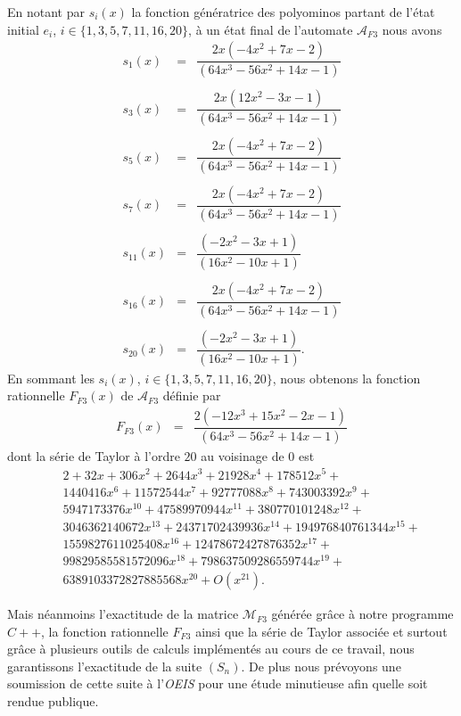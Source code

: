 En notant par $s_{i}(x)$ la fonction génératrice des polyominos partant de l'état initial $e_{i}$, $i\in \{1, 3, 5, 7, 11, 16, 20\}$, à un état final de l'automate $\mathcal{A}_{F3}$ nous avons
\begin{eqnarray*}
s_1(x)& = & \dfrac{2x(-4x^{2} + 7x - 2)}{(64x^{3} - 56x^{2} + 14x - 1)}\\
& &\\
s_3(x)& = & \dfrac{2x(12x^{2} - 3x - 1)}{(64x^{3} - 56x^{2} + 14x - 1)}\\
& &\\
s_5(x)& = & \dfrac{2x(-4x^{2} + 7x - 2)}{(64x^{3} - 56x^{2} + 14x - 1)}\\
& &\\
s_7(x)& = & \dfrac{2x(-4x^{2} + 7x - 2)}{(64x^{3} - 56x^{2} + 14x - 1)}\\
& &\\
s_{11}(x) & = & \dfrac{(-2x^{2} - 3x + 1)}{(16x^{2} - 10x + 1)}\\
& &\\
s_{16}(x) & = & \dfrac{2x(-4x^{2} + 7x - 2)}{(64x^{3} - 56x^{2} + 14x - 1)}\\
& &\\
s_{20}(x) & = & \dfrac{(-2x^{2} - 3x + 1)}{(16x^{2} - 10x + 1)}.
\end{eqnarray*}
En sommant les $s_{i}(x)$,  $i\in \{1, 3, 5, 7, 11, 16, 20\}$, nous obtenons la fonction rationnelle $F_{F3}(x)$ de $\mathcal{A}_{F3}$ définie par
\begin{eqnarray*}
F_{F3}(x) & = & \dfrac{2(-12x^{3} + 15x^{2} - 2x - 1)}{(64x^{3} - 56x^{2} + 14x - 1)}
\end{eqnarray*}
dont la série de Taylor à l'ordre $20$ au voisinage de $0$ est 
 \begin{eqnarray*}
& & 2+32x+306x^{2}+2644x^{3}+21928x^{4}+178512x^{5}+\\
& & 1440416x^{6}+11572544x^{7}+92777088x^{8}+743003392x^{9}+\\
 & & 5947173376x^{10}+47589970944x^{11}+380770101248x^{12}+\\
 & & 3046362140672x^{13}+24371702439936x^{14}+194976840761344x^{15}+\\
 & & 1559827611025408x^{16}+12478672427876352x^{17}+\\
 & & 99829585581572096x^{18}+798637509286559744x^{19}+\\
 & & 6389103372827885568x^{20}+O(x^{21}).
 \end{eqnarray*}



 Mais néanmoins l'exactitude de la matrice $\mathcal{M}_{F3}$ générée grâce à notre programme $C++$, la fonction rationnelle $F_{F3}$ ainsi que la série de Taylor associée  et surtout grâce à plusieurs outils de calculs implémentés au cours de ce travail, nous garantissons l'exactitude de la suite $(S_{n})$. De plus nous prévoyons une soumission de cette suite à l'\emph{OEIS} pour une étude minutieuse afin quelle soit rendue publique.

